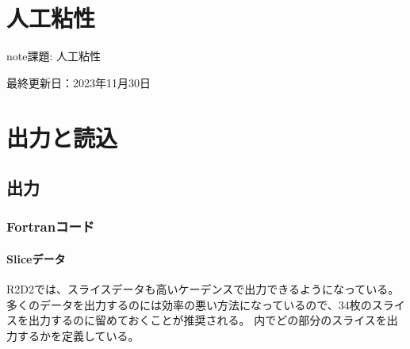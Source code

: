 \documentclass[letterpaper,10pt,dvipdfmx,report]{sphinxmanual}
\begin{document}
\sphinxstepscope


\chapter{人工粘性}
\label{\detokenize{artdif:id1}}\label{\detokenize{artdif::doc}}
\begin{sphinxadmonition}{note}{\label{\detokenize{artdif:id2}}課題:}
\sphinxAtStartPar
人工粘性
\end{sphinxadmonition}

\sphinxAtStartPar
最終更新日：2023年11月30日

\sphinxstepscope


\chapter{出力と読込}
\label{\detokenize{io:id1}}\label{\detokenize{io::doc}}

\section{出力}
\label{\detokenize{io:id2}}

\subsection{Fortranコード}
\label{\detokenize{io:fortran}}

\subsubsection{Sliceデータ}
\label{\detokenize{io:slice}}
\sphinxAtStartPar
R2D2では、スライスデータも高いケーデンスで出力できるようになっている。多くのデータを出力するのには効率の悪い方法になっているので、3\sphinxhyphen{}4枚のスライスを出力するのに留めておくことが推奨される。  内でどの部分のスライスを出力するかを定義している。

\begin{sphinxVerbatim}[commandchars=\\\{\}]
\end{sphinxVerbatim}
\end{document}
